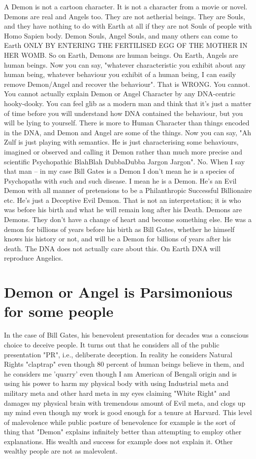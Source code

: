 \documentclass{amsart}
\begin{document}
A Demon is not a cartoon character.  It is not a character from a movie or novel.  Demons are real and Angels too.  They are not aetherial beings.  They are Souls, and they have nothing to do with Earth at all if they are not Souls of people with Homo Sapien body.  Demon Souls, Angel Souls, and many others can come to Earth ONLY BY ENTERING THE FERTILISED EGG OF THE MOTHER IN HER WOMB.  So on Earth, Demons are human beings.  On Earth, Angels are human beings.  Now you can say, "whatever characteristic you exhibit about any human being, whatever behaviour you exhibit of a human being, I can easily remove Demon/Angel and recover the behaviour".  That is WRONG.  You cannot.  You cannot actually explain Demon or Angel Character by any DNA-centric hooky-dooky.  You can feel glib as a modern man and think that it's just a matter of time before you will understand how DNA contained the behaviour, but you will be lying to yourself.  There is more to Human Character than things encoded in the DNA, and Demon and Angel are some of the things.  Now you can say, "Ah Zulf is just playing with semantics.  He is just characterising some behaviours, imagined or observed and calling it Demon rather than much more precise and scientific Psychopathic BlahBlah DubbaDubba Jargon Jargon".  No.  When I say that man -- in my case Bill Gates is a Demon I don't mean he is a species of Psychopaths with such and such disease.  I mean he is a Demon.  He's an Evil Demon with all manner of pretensions to be a Philanthropic Successful Billionaire etc.  He's just a Deceptive Evil Demon.  That is not an interpretation; it is who was before his birth and what he will remain long after his Death.  Demons are Demons.  They don't have a change of heart and become something else.  He was a demon for billions of years before his birth as Bill Gates, whether he himself knows his history or not, and will be a Demon for billions of years after his death.  The DNA does not actually care about this.  On Earth DNA will reproduce Angelics.

\section{Demon or Angel is Parsimonious for some people}

In the case of Bill Gates, his benevolent presentation for decades was a conscious choice to deceive people.  It turns out that he considers all of the public presentation "PR", i.e., deliberate deception.  In reality he considers Natural Rights "claptrap" even though 80 percent of human beings believe in them, and he considers me 'quarry' even though I am American of Bengali origin and is using his power to harm my physical body with using Industrial meta and military meta and other hard meta in my eyes claiming "White Right" and damages my physical brain with tremendous amount of Evil meta, and clogs up my mind even though my work is good enough for a tenure at Harvard. This level of malevolence while public posture of benevolence for example is the sort of thing that "Demon" explains infinitely better than attempting to employ other explanations.  His wealth and success for example does not explain it.  Other wealthy people are not as malevolent.
\end{document}
